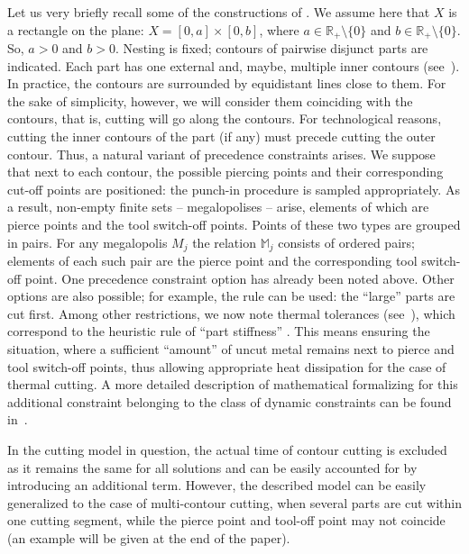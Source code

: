 \label{sec:3}

Let us very briefly recall some of the constructions of
\cite [$\S$ 3.3]{4}.
We assume here that $ X $ is a rectangle on the plane:
$X = [0,a] \times [0,b]$,
where
$a \in \mathbb{R}_+ \setminus \{0\}$
and $b \in \mathbb{R}_+ \setminus \{0\}.$
So, $a > 0$ and
$b > 0$.
Nesting is fixed;
contours of pairwise disjunct parts are indicated.
Each part has one external and,
maybe,
multiple inner contours
(see~\cite[\S~3.2]{4}).
In practice,
the contours are surrounded by equidistant lines close to them.
For the sake of simplicity,
however,
we will consider them coinciding with the contours,
that is, cutting will go along the contours.
For technological reasons,
cutting the inner contours of the part
(if any)
must precede cutting the outer contour.
Thus, a natural variant of precedence constraints arises.
We suppose
that next to each contour, the possible
piercing points and their corresponding cut-off points
are positioned:
the punch-in procedure is sampled appropriately.
As a result, non-empty finite sets
-- megalopolises --
arise,
elements of which are pierce points
and the tool switch-off points.
Points of these two types are grouped in pairs.
For any megalopolis
$M_j$
the relation
$\mathbb{M}_j$
consists of ordered pairs;
elements of each such pair are
the pierce point
and the corresponding tool switch-off point.
One precedence constraint option has already been noted above.
Other options are also possible;
for example, the rule can be used: the ``large'' parts are cut first.
Among other restrictions, we now note
thermal tolerances (see~\cite{18}),
which correspond to the heuristic rule of ``part stiffness''
\cite{4}.
This means ensuring the situation,
where
a sufficient ``amount''
of uncut metal remains next to pierce and tool switch-off points, thus allowing appropriate
heat dissipation for the case of thermal cutting.
A more detailed description of mathematical
formalizing for this additional
constraint belonging to the class of dynamic constraints
can be found in~\cite{18}.

In the cutting model in question,
the actual time of contour cutting
is excluded
as it remains the same for all solutions
and can be easily accounted for by introducing an
additional term.
However,
the described model can be easily generalized to
the case of multi-contour cutting,
when
several parts are cut within one cutting segment,
while the pierce point
and tool-off point
may not coincide
(an example will be given at the end
of the paper).

